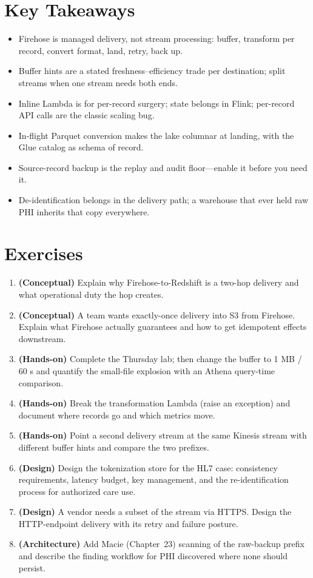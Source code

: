 \section*{Key Takeaways}
\begin{itemize}
    \item Firehose is managed delivery, not stream processing: buffer, transform per record, convert format, land, retry, back up.
    \item Buffer hints are a stated freshness--efficiency trade per destination; split streams when one stream needs both ends.
    \item Inline Lambda is for per-record surgery; state belongs in Flink; per-record API calls are the classic scaling bug.
    \item In-flight Parquet conversion makes the lake columnar at landing, with the Glue catalog as schema of record.
    \item Source-record backup is the replay and audit floor---enable it before you need it.
    \item De-identification belongs in the delivery path; a warehouse that ever held raw PHI inherits that copy everywhere.
\end{itemize}

\section{Exercises}
\begin{enumerate}
    \item \textbf{(Conceptual)} Explain why Firehose-to-Redshift is a two-hop delivery and what operational duty the hop creates.
    \item \textbf{(Conceptual)} A team wants exactly-once delivery into S3 from Firehose. Explain what Firehose actually guarantees and how to get idempotent effects downstream.
    \item \textbf{(Hands-on)} Complete the Thursday lab; then change the buffer to 1 MB / 60 s and quantify the small-file explosion with an Athena query-time comparison.
    \item \textbf{(Hands-on)} Break the transformation Lambda (raise an exception) and document where records go and which metrics move.
    \item \textbf{(Hands-on)} Point a second delivery stream at the same Kinesis stream with different buffer hints and compare the two prefixes.
    \item \textbf{(Design)} Design the tokenization store for the HL7 case: consistency requirements, latency budget, key management, and the re-identification process for authorized care use.
    \item \textbf{(Design)} A vendor needs a subset of the stream via HTTPS. Design the HTTP-endpoint delivery with its retry and failure posture.
    \item \textbf{(Architecture)} Add Macie (Chapter~23) scanning of the raw-backup prefix and describe the finding workflow for PHI discovered where none should persist.
\end{enumerate}


